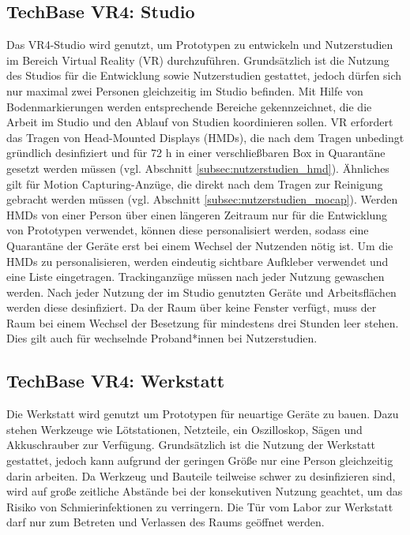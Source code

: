 \subsection{TechBase VR4: Studio}\label{subsec:labore_vr4_stuio}


\noindent
Das VR4-Studio wird genutzt, um Prototypen zu entwickeln und Nutzerstudien im Bereich Virtual Reality (VR) durchzuführen.
Grundsätzlich ist die Nutzung des Studios für die Entwicklung sowie Nutzerstudien gestattet, jedoch dürfen sich nur maximal zwei Personen gleichzeitig im Studio befinden. Mit Hilfe von Bodenmarkierungen werden entsprechende Bereiche gekennzeichnet, die die Arbeit im Studio und den Ablauf von Studien koordinieren sollen. VR erfordert das Tragen von Head-Mounted Displays (HMDs), die nach dem Tragen unbedingt gründlich desinfiziert und für 72 h in einer verschließbaren Box in Quarantäne gesetzt werden müssen (vgl. Abschnitt \ref{subsec:nutzerstudien_hmd}).
Ähnliches gilt für Motion Capturing-Anzüge, die direkt nach dem Tragen zur Reinigung gebracht werden müssen (vgl. Abschnitt \ref{subsec:nutzerstudien_mocap}).
Werden HMDs von einer Person über einen längeren Zeitraum nur für die Entwicklung von Prototypen verwendet, können diese personalisiert werden, sodass eine Quarantäne der Geräte erst bei einem Wechsel der Nutzenden nötig ist.
Um die HMDs zu personalisieren, werden eindeutig sichtbare Aufkleber verwendet und eine Liste eingetragen.
Trackinganzüge müssen nach jeder Nutzung gewaschen werden.
Nach jeder Nutzung der im Studio genutzten Geräte und Arbeitsflächen werden diese desinfiziert.
Da der Raum über keine Fenster verfügt, muss der Raum bei einem Wechsel der Besetzung für mindestens drei Stunden leer stehen.
Dies gilt auch für wechselnde Proband*innen bei Nutzerstudien.

\subsection{TechBase VR4: Werkstatt}\label{subsec:labore_vr4_werkstatt}


\noindent
Die Werkstatt wird genutzt um Prototypen für neuartige Geräte zu bauen. Dazu stehen Werkzeuge wie Lötstationen, Netzteile, ein Oszilloskop, Sägen und Akkuschrauber zur Verfügung. Grundsätzlich ist die Nutzung der Werkstatt gestattet, jedoch kann aufgrund der geringen Größe nur eine Person gleichzeitig darin arbeiten. Da Werkzeug und Bauteile teilweise schwer zu desinfizieren sind, wird auf große zeitliche Abstände bei der konsekutiven Nutzung geachtet, um das Risiko von Schmierinfektionen zu verringern. Die Tür vom Labor zur Werkstatt darf nur zum Betreten und Verlassen des Raums geöffnet werden.
